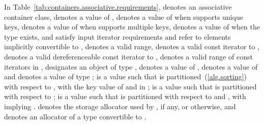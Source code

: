 \pnum
In Table~\ref{tab:containers.associative.requirements},
 denotes an associative container class,
 denotes a value of ,
 denotes a value of 
when  supports unique keys,
 denotes a value of 
when  supports multiple keys,
 denotes a value of  when the type
 exists,
 and 
satisfy input iterator requirements and refer to elements
implicitly convertible to
, 
denotes a valid range,
 denotes a valid const iterator to ,
 denotes a valid dereferenceable const iterator to ,
\tcode{[q1, q2)} denotes a valid range of const iterators in ,
 designates an object of type ,
 denotes a value of ,
 denotes a value of 
and  denotes a value of type ;
 is a value such that  is partitioned~(\ref{alg.sorting})
with respect to , with  the key value of 
and  in ;
 is a value such that  is partitioned with respect to
;
 is a value such that  is partitioned with respect to
 and , with  implying
.
 denotes the storage allocator used by , if any, or  otherwise, and  denotes an allocator of a type convertible to .

